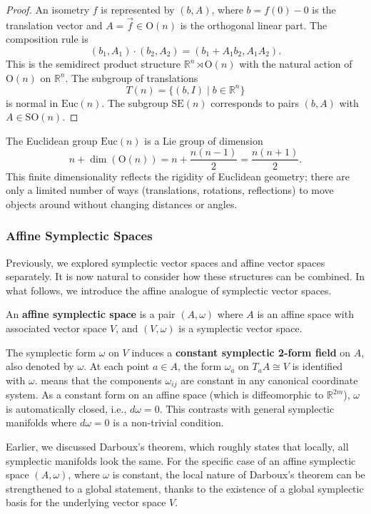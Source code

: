 \begin{proof}
An isometry $f$ is represented by $(b, A)$, where $b = f(0) - 0$ is the translation vector and $A = \vec{f} \in \text{O}(n)$ is the orthogonal linear part. The composition rule is
\[
(b_1, A_1) \cdot (b_2, A_2) = (b_1 + A_1 b_2, A_1 A_2).
\]
This is the semidirect product structure $\mathbb{R}^n \rtimes \text{O}(n)$ with the natural action of $\text{O}(n)$ on $\mathbb{R}^n$. The subgroup of translations
\[
T(n) = \{ (b, I) \mid b \in \mathbb{R}^n \}
\]
is normal in $\text{Euc}(n)$. The subgroup $\text{SE}(n)$ corresponds to pairs $(b, A)$ with $A \in \text{SO}(n)$.
\end{proof}

The Euclidean group $\text{Euc}(n)$ is a Lie group of dimension
\[
n + \dim(\text{O}(n)) = n + \frac{n(n-1)}{2} = \frac{n(n+1)}{2}.
\]
This finite dimensionality reflects the rigidity of Euclidean geometry; there are only a limited number of ways (translations, rotations, reflections) to move objects around without changing distances or angles.

\subsubsection{Affine Symplectic Spaces}

Previously, we explored symplectic vector spaces and affine vector spaces separately. It is now natural to consider how these structures can be combined. In what follows, we introduce the affine analogue of symplectic vector spaces.

\begin{definition} \label{def:affine_symplectic_space}
An \textbf{affine symplectic space} is a pair $(A, \omega)$ where $A$ is an affine space with associated vector space $V$, and $(V, \omega)$ is a symplectic vector space.
\end{definition}

The symplectic form $\omega$ on $V$ induces a \textbf{constant symplectic 2-form field} on $A$, also denoted by $\omega$. At each point $a \in A$, the form $\omega_a$ on $T_a A \cong V$ is identified with $\omega$.  means that the components $\omega_{ij}$ are constant in any canonical coordinate system. As a constant form on an affine space (which is diffeomorphic to $\mathbb{R}^{2m}$), $\omega$ is automatically closed, i.e., $d\omega = 0$. This contrasts with general symplectic manifolds where $d\omega = 0$ is a non-trivial condition.

Earlier, we discussed Darboux's theorem, which roughly states that locally, all symplectic manifolds look the same. For the specific case of an affine symplectic space $(A, \omega)$, where $\omega$ is constant, the local nature of Darboux's theorem can be strengthened to a global statement, thanks to the existence of a global symplectic basis for the underlying vector space $V$.

